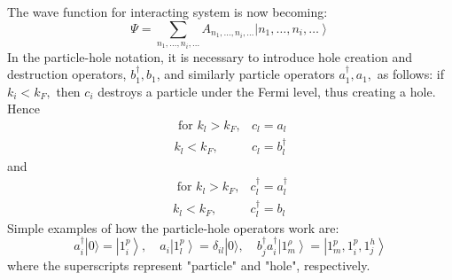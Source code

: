 The wave function for interacting system is now becoming:
\begin{equation}\Psi=\sum_{n_{1}, \ldots, n_{i}, \ldots} A_{n_{1}, \ldots, n_{i}, \ldots}\left|n_{1}, \ldots, n_{i}, \ldots\right\rangle\end{equation}
In the particle-hole notation, it is necessary to introduce hole creation and destruction operators, $b_1^{\dagger}, b_{1}$, and similarly particle operators $a_1^{\dagger}, a_{1},$ as follows:
if $k_{i}<k_{F},$ then $c_{i}$ destroys a particle under the Fermi level, thus creating a hole. Hence
\begin{equation}\begin{aligned}
\text { for } k_{l}>k_{F}, & c_{l}=a_{l} \\
k_{l}<k_{F}, & c_{l}=b^{\dagger}_l
\end{aligned}\end{equation}
and
\begin{equation}\begin{aligned}
\text { for } k_{l}>k_{F}, & c_{l}^{\dagger}=a_{l}^{\dagger} \\
k_{l}<k_{F}, & c_{l}^{\dagger}=b_{l}
\end{aligned}\end{equation}
Simple examples of how the particle-hole operators work are:
$$a_{i}^{\dagger}|0\rangle=\left|1_i^{p}\right\rangle, \quad a_{i}\left|1_l^{p}\right\rangle=\delta_{il}|0\rangle, \quad b_{j}^{\dagger} a_{i}^{\dagger}\left|1_{m}^{\rho}\right\rangle=\left|1_{m}^{p}, 1_i^{p}, 1_j^{h}\right\rangle$$
where the superscripts represent "particle" and "hole", respectively.